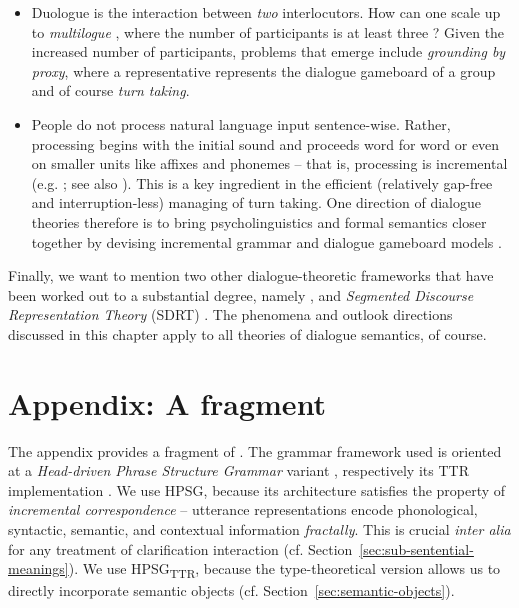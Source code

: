 \documentclass[output=paper]{langsci/langscibook}
\begin{document}
{\begin{itemize}
\item Duologue  is the interaction between \emph{two} interlocutors.
%
How can one scale up to \emph{multilogue} , where the number of participants is at least three \citep{Ginzburg:Fernandez:2005}?
%
Given the increased number of participants,  problems that emerge include  \emph{grounding by proxy},  where a representative represents the dialogue gameboard of a group \citep{Eshghi:Healey:2016} and of course \emph{turn taking}.

\item People do not process natural language input sentence-wise.
%
Rather, processing begins with the initial sound and proceeds word for word or even on smaller units like affixes and phonemes -- that is, processing is incremental   (e.g. \citet{Sedivy:Tanenhaus:Chambers:Carlson:1999}; see also ). This is a key ingredient in the efficient (relatively gap-free and interruption-less) managing of turn taking.
%
One direction of dialogue theories therefore is to bring psycholinguistics and formal semantics closer together by devising incremental grammar and dialogue gameboard models \citep{Hough:Kennington:Schlangen:Ginzburg:2015,Demberg:Keller:Koller:2013,Poesio:Rieser:2011}.

\end{itemize}


Finally, we want to mention two other dialogue-theoretic frameworks that have been worked out to a substantial degree, namely  \citep{Traum:1994,Poesio:1995,Poesio:Traum:1997,Poesio:Rieser:2010}, and \emph{Segmented Discourse Representation Theory}  (SDRT) \citep{Asher:1993,Asher:Lascarides:2003,Asher:Lascarides:2013,Hunter:Asher:2015}.
%
The phenomena and outlook directions discussed in this chapter apply to all theories of dialogue semantics, of course. 




\section*{Appendix: A \HPSGTTR fragment}

The appendix provides a fragment of \HPSGTTR.
%
The grammar framework used is oriented at a \textit{Head-driven Phrase Structure Grammar} variant \citep{Sag:Wasow:Bender:2003}, respectively its TTR implementation \citep{Cooper:2008}.
%
We use HPSG, because its  architecture satisfies the property of \emph{incremental correspondence} \citep{Johnson:Lappin:1999} -- utterance representations encode phonological, syntactic, semantic, and contextual information \emph{fractally}.
%
 This is crucial {\it inter alia} for any treatment of clarification interaction (cf. Section~\ref{sec:sub-sentential-meanings}). 
%
We use HPSG\textsubscript{TTR}, because the type-theoretical version allows us to directly incorporate semantic objects (cf. Section~\ref{sec:semantic-objects}).


}
\end{document}
